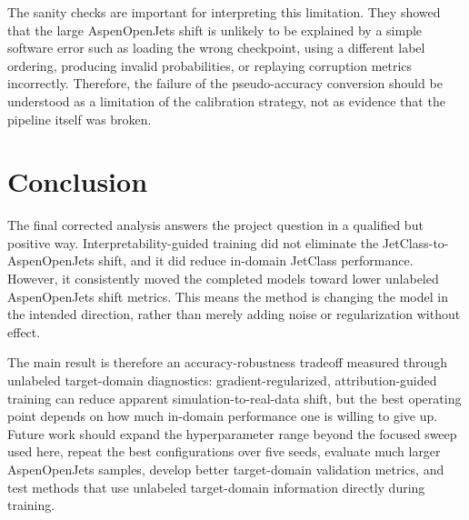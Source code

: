 \documentclass[11pt]{article}
\begin{document}
The sanity checks are important for interpreting this limitation. They showed that the large AspenOpenJets shift is unlikely to be explained by a simple software error such as loading the wrong checkpoint, using a different label ordering, producing invalid probabilities, or replaying corruption metrics incorrectly. Therefore, the failure of the pseudo-accuracy conversion should be understood as a limitation of the calibration strategy, not as evidence that the pipeline itself was broken.

\section{Conclusion}

The final corrected analysis answers the project question in a qualified but positive way. Interpretability-guided training did not eliminate the JetClass-to-AspenOpenJets shift, and it did reduce in-domain JetClass performance. However, it consistently moved the completed models toward lower unlabeled AspenOpenJets shift metrics. This means the method is changing the model in the intended direction, rather than merely adding noise or regularization without effect.

The main result is therefore an accuracy-robustness tradeoff measured through unlabeled target-domain diagnostics: gradient-regularized, attribution-guided training can reduce apparent simulation-to-real-data shift, but the best operating point depends on how much in-domain performance one is willing to give up. Future work should expand the hyperparameter range beyond the focused sweep used here, repeat the best configurations over five seeds, evaluate much larger AspenOpenJets samples, develop better target-domain validation metrics, and test methods that use unlabeled target-domain information directly during training.



\end{document}
